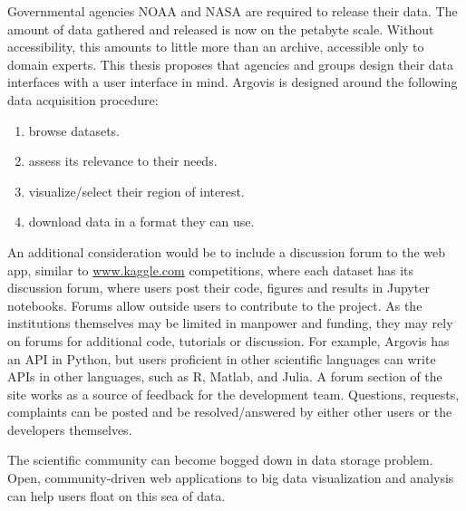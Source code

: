Governmental agencies NOAA and NASA are required to release their data. The amount of data gathered and released is now on the petabyte scale. Without accessibility, this amounts to little more than an archive, accessible only to domain experts. This thesis proposes that agencies and groups design their data interfaces with a user interface in mind. Argovis is designed around the following data acquisition procedure: 
\begin{enumerate}
  \item browse datasets. 
  \item assess its relevance to their needs.
  \item visualize/select their region of interest.
  \item download data in a format they can use.
\end{enumerate}
An additional consideration would be to include a discussion forum to the web app, similar to \url{www.kaggle.com} \cite{kaggle} competitions, where each dataset has its discussion forum, where users post their code, figures and results in \gls{Jupyter} notebooks. Forums allow outside users to contribute to the project. As the institutions themselves may be limited in manpower and funding, they may rely on forums for additional code, tutorials or discussion. For example, Argovis has an API in Python, but users proficient in other scientific languages can write APIs in other languages, such as R, Matlab, and Julia. A forum section of the site works as a source of feedback for the development team. Questions, requests, complaints can be posted and be resolved/answered by either other users or the developers themselves.

The scientific community can become bogged down in data storage problem. Open, community-driven web applications to big data visualization and analysis can help users float on this sea of data.